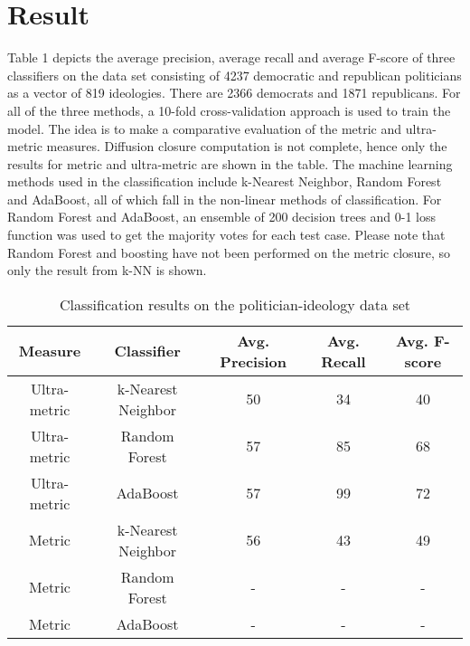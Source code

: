 \documentclass[12pt]{article}
\begin{document}
\section{Result}
Table 1 depicts the average precision, average recall and average F-score of three classifiers on the data set consisting of 4237 democratic and republican politicians as a vector of 819 ideologies. There are 2366 democrats and 1871 republicans. For all of the three methods, a 10-fold cross-validation approach is used to train the model. The idea is to make a comparative evaluation of the metric and ultra-metric measures. Diffusion closure computation is not complete, hence only the results for metric and ultra-metric are shown in the table. The machine learning methods used in the classification include k-Nearest Neighbor, Random Forest and AdaBoost, all of which fall in the non-linear methods of classification. For Random Forest and AdaBoost, an ensemble of 200 decision trees and 0-1 loss function was used to get the majority votes for each test case.  Please note that Random Forest and boosting have not been performed on the metric closure, so only the result from k-NN is shown.

\begin{table}
\centering
\begin{tabular}{|c|c|c|c|c|}
\hline
Measure & Classifier & Avg. Precision & Avg. Recall & Avg. F-score \\ \hline \hline
Ultra-metric & k-Nearest Neighbor & 50 & 34 & 40 \\ \hline
Ultra-metric & Random Forest & 57 & 85 & 68 \\ \hline
Ultra-metric & AdaBoost & 57 & 99 & 72 \\ \hline
Metric & k-Nearest Neighbor & 56 & 43 & 49 \\ \hline
Metric & Random Forest & - & - & - \\ \hline
Metric & AdaBoost & - & - & - \\ \hline

\end{tabular}
\caption{Classification results on the politician-ideology data set}
\end{table}
\end{document}
